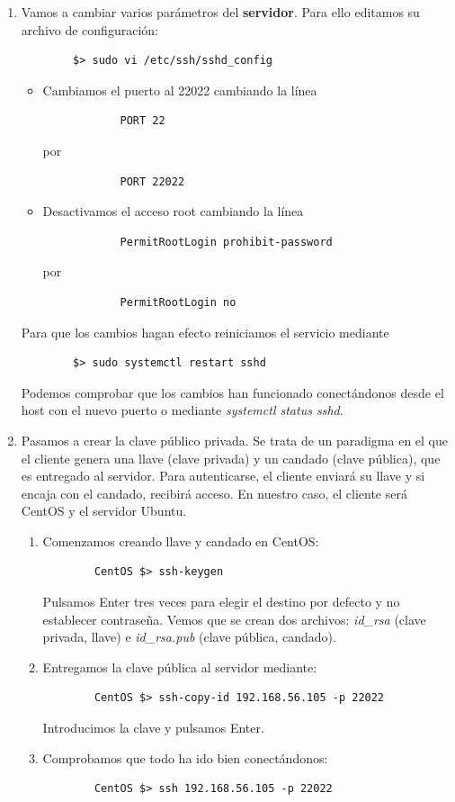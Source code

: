 \documentclass[12pt,spanish]{article}
\begin{document}
\begin{enumerate}
	\item Vamos a cambiar varios parámetros del \textbf{servidor}. Para ello editamos su archivo de configuración:
	\begin{lstlisting}
		$> sudo vi /etc/ssh/sshd_config
	\end{lstlisting}
	\begin{itemize}
		\item Cambiamos el puerto al 22022 cambiando la línea
		\begin{lstlisting}
			PORT 22
		\end{lstlisting}
		por
		\begin{lstlisting}
			PORT 22022
		\end{lstlisting}
		\item Desactivamos el acceso root cambiando la línea
		\begin{lstlisting}
			PermitRootLogin prohibit-password
		\end{lstlisting}
		por
		\begin{lstlisting}
			PermitRootLogin no
		\end{lstlisting}
	\end{itemize}
	Para que los cambios hagan efecto reiniciamos el servicio mediante
	\begin{lstlisting}
		$> sudo systemctl restart sshd
	\end{lstlisting}
	Podemos comprobar que los cambios han funcionado conectándonos desde el host con el nuevo puerto o mediante \textit{systemctl status sshd}.
	\item Pasamos a crear la clave público privada. Se trata de un paradigma en el que el cliente genera una llave (clave privada) y un candado (clave pública), que es entregado al servidor. Para autenticarse, el cliente enviará su llave y si encaja con el candado, recibirá acceso. En nuestro caso, el cliente será CentOS y el servidor Ubuntu.
	\begin{enumerate}
		\item Comenzamos creando llave y candado en CentOS:
		\begin{lstlisting}
		CentOS $> ssh-keygen
		\end{lstlisting}
		Pulsamos Enter tres veces para elegir el destino por defecto y no establecer contraseña. Vemos que se crean dos archivos: \textit{id\_rsa} (clave privada, llave) e \textit{id\_rsa.pub} (clave pública, candado).
		\item Entregamos la clave pública al servidor mediante:
		\begin{lstlisting}
		CentOS $> ssh-copy-id 192.168.56.105 -p 22022
		\end{lstlisting}
		Introducimos la clave y pulsamos Enter.
		\item Comprobamos que todo ha ido bien conectándonos:
		\begin{lstlisting}
		CentOS $> ssh 192.168.56.105 -p 22022
		\end{lstlisting}
	\end{enumerate}
\end{enumerate}
\end{document}
